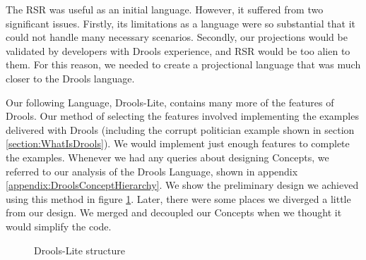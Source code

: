 The RSR was useful as an initial language. 
However, it suffered from two significant issues.
Firstly, its limitations as a language were so substantial that it could not handle many necessary scenarios.
Secondly, our projections would be validated by developers with Drools experience, and RSR would be too alien to them.
For this reason, we needed to create a projectional language that was much closer to the Drools language.

Our following Language, Drools-Lite, contains many more of the features of Drools.
Our method of selecting the features involved implementing the examples delivered with Drools (including the corrupt politician example shown in section \ref{section:WhatIsDrools}).
We would implement just enough features to complete the examples.
Whenever we had any queries about designing Concepts, we referred to our analysis of the Drools Language, shown in appendix \ref{appendix:DroolsConceptHierarchy}.
We show the preliminary design we achieved using this method in figure \ref{fig:DroolsLiteDiagram}.
Later, there were some places we diverged a little from our design.
We merged and decoupled our Concepts when we thought it would simplify the code.

\begin{figure}[htbp]
    \centering
    \caption{Drools-Lite structure}
    \label{fig:DroolsLiteDiagram}
\end{figure}
 
